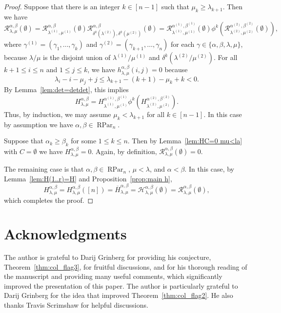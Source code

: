 \documentclass[12pt]{amsart}
\numberwithin{equation}{section}
\theoremstyle{definition}
\newcommand\ovH{\overline{H}}
\newcommand\RPar{\operatorname{RPar}}
\newcommand\lm{{\lambda/\mu}}
\newcommand\R{\mathcal{R}}
\newcommand\HH{\mathcal{H}}
\begin{document}
\begin{proof}
  Suppose that there is an integer $k\in[n-1]$ such that $\mu_k\ge
  \lambda_{k+1}$. Then we have
  \[
    \R_{\lambda,\mu}^{\alpha,\beta}(\emptyset) =
    \R_{\lambda^{(1)},\mu^{(1)}}^{\alpha,\beta}(\emptyset)
    \R_{\delta^k(\lambda^{(2)}),\delta^k(\mu^{(2)})}^{\alpha,\beta}(\emptyset)=
    \R_{\lambda^{(1)},\mu^{(1)}}^{\alpha^{(1)},\beta^{(1)}}(\emptyset)
    \phi^k\left(\R_{\lambda^{(2)},\mu^{(2)}}^{\alpha^{(2)},\beta^{(2)}}(\emptyset)\right),
  \]
  where $\gamma^{(1)}=(\gamma_1,\dots,\gamma_k)$ and
  $\gamma^{(2)}=(\gamma_{k+1},\dots,\gamma_n)$ for each
  $\gamma\in\{\alpha,\beta,\lambda,\mu\}$, because $\lm$ is the disjoint union
  of $\lambda^{(1)}/\mu^{(1)}$ and $\delta^k(\lambda^{(2)}/\mu^{(2)})$. For all
  $k+1\le i\le n$ and $1\le j\le k$, we have
  $h^{\alpha,\beta}_{\lambda,\mu}(i,j)=0$ because
 \[
    \lambda_i-i-\mu_j+j \le \lambda_{k+1}-(k+1)-\mu_k+k <0.
  \]
  By Lemma~\ref{lem:det=detdet}, this implies
  \[
    H_{\lambda,\mu}^{\alpha,\beta} = H_{\lambda^{(1)},\mu^{(1)}}^{\alpha^{(1)},\beta^{(1)}}
    \phi^k\left(H_{\lambda^{(2)},\mu^{(2)}}^{\alpha^{(2)},\beta^{(2)}}\right).
  \]
  Thus, by induction, we may assume $\mu_k<\lambda_{k+1}$ for all $k\in[n-1]$.
  In this case by assumption we have $\alpha,\beta\in\RPar_n$.




  Suppose that $\alpha_k\ge\beta_k$ for some $1\le k\le n$. Then by
  Lemma~\ref{lem:HC=0 mu<la} with $C=\emptyset$ we have
  $H_{\lambda,\mu}^{\alpha,\beta}=0$. Again, by definition,
  $\R_{\lambda,\mu}^{\alpha,\beta}(\emptyset)=0$.

  The remaining case is that $\alpha,\beta\in\RPar_n$, $\mu<\lambda$, and
  $\alpha<\beta$. In this case, by Lemma~\ref{lem:H(1..r)=H} and
  Proposition~\ref{prop:main h},
  \[
    H_{\lambda,\mu}^{\alpha,\beta} = H_{\lambda,\mu}^{\alpha,\beta}([n]) =
    \ovH_{\lambda,\mu}^{\alpha,\beta} =
    \HH_{\lambda,\mu}^{\alpha,\beta}(\emptyset) =
    \R_{\lambda,\mu}^{\alpha,\beta}(\emptyset),
  \]
which completes the proof.
\end{proof}


\section*{Acknowledgments}
The author is grateful to Darij Grinberg for providing his conjecture,
Theorem~\ref{thm:col_flag3}, for fruitful discussions, and for his thorough
reading of the manuscript and providing many useful comments, which
significantly improved the presentation of this paper. The author is
particularly grateful to Darij Grinberg for the idea that improved
Theorem~\ref{thm:col_flag2}. He also thanks Travis Scrimshaw for helpful
discussions.
\end{document}
